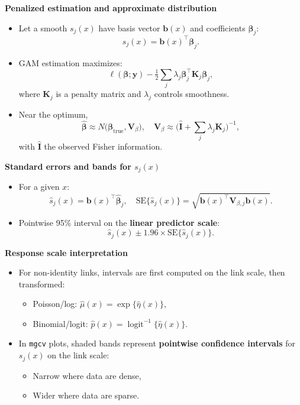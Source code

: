 \documentclass[
  letterpaper,
  DIV=11,
  numbers=noendperiod]{scrreprt}
\providecommand{\tightlist}{%
  \setlength{\itemsep}{0pt}\setlength{\parskip}{0pt}}\usepackage{longtable,booktabs,array}
\begin{document}
\markright{\textcolor{purple}{3. Uncertainty Bands for Smooths (Module 5A)}}

\textbf{Penalized estimation and approximate distribution}

\begin{itemize}
\tightlist
\item
  Let a smooth \(s_j(x)\) have basis vector \(\mathbf{b}(x)\) and
  coefficients \(\boldsymbol{\beta}_j\): \[
  s_j(x) = \mathbf{b}(x)^\top \boldsymbol{\beta}_j.
  \]
\item
  GAM estimation maximizes: \[
  \ell(\boldsymbol{\beta};\mathbf{y})
  - \tfrac{1}{2}\sum_j \lambda_j \boldsymbol{\beta}_j^\top \mathbf{K}_j \boldsymbol{\beta}_j,
  \] where \(\mathbf{K}_j\) is a penalty matrix and \(\lambda_j\)
  controls smoothness.
\item
  Near the optimum, \[
  \hat{\boldsymbol{\beta}} \approx
  N\!\Big(\boldsymbol{\beta}_{\text{true}},
    \mathbf{V}_\beta\Big),
  \quad
  \mathbf{V}_\beta \approx
  \big(\hat{\mathbf{I}} + \sum_j \lambda_j \mathbf{K}_j\big)^{-1},
  \] with \(\hat{\mathbf{I}}\) the observed Fisher information.
\end{itemize}

\textbf{Standard errors and bands for \(s_j(x)\)}

\begin{itemize}
\tightlist
\item
  For a given \(x\): \[
  \hat{s}_j(x) = \mathbf{b}(x)^\top \hat{\boldsymbol{\beta}}_j, \quad
  \mathrm{SE}\{\hat{s}_j(x)\} =
  \sqrt{\mathbf{b}(x)^\top \mathbf{V}_{\beta,j} \mathbf{b}(x)}.
  \]
\item
  Pointwise 95\% interval on the \textbf{linear predictor scale}: \[
  \hat{s}_j(x) \pm 1.96 \times \mathrm{SE}\{\hat{s}_j(x)\}.
  \]
\end{itemize}

\textbf{Response scale interpretation}

\begin{itemize}
\tightlist
\item
  For non-identity links, intervals are first computed on the link
  scale, then transformed:

  \begin{itemize}
  \tightlist
  \item
    Poisson/log: \(\hat{\mu}(x) = \exp\{\hat{\eta}(x)\}\),
  \item
    Binomial/logit:
    \(\hat{p}(x) = \operatorname{logit}^{-1}\{\hat{\eta}(x)\}\).
  \end{itemize}
\item
  In \texttt{mgcv} plots, shaded bands represent \textbf{pointwise
  confidence intervals} for \(s_j(x)\) on the link scale:

  \begin{itemize}
  \tightlist
  \item
    Narrow where data are dense,
  \item
    Wider where data are sparse.
  \end{itemize}
\end{itemize}
\end{document}
